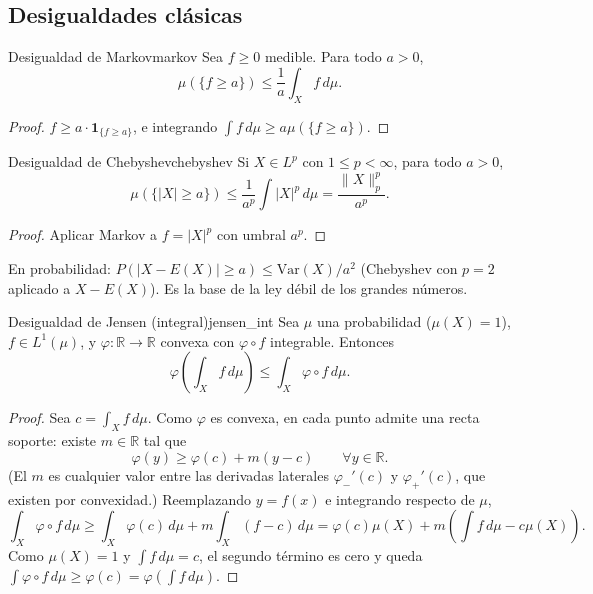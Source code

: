 \documentclass[11pt, a4paper]{article}
\begin{document}
\subsection{Desigualdades clásicas}

\begin{teorema}{Desigualdad de Markov}{markov}
Sea $f \ge 0$ medible. Para todo $a > 0$,
$$ \mu(\{f \ge a\}) \le \frac{1}{a} \int_X f \, d\mu. $$
\end{teorema}

\begin{proof}
$f \ge a \cdot \mathbf{1}_{\{f \ge a\}}$, e integrando $\int f \, d\mu \ge a \mu(\{f \ge a\})$.
\end{proof}

\begin{corolario}{Desigualdad de Chebyshev}{chebyshev}
Si $X \in L^p$ con $1 \le p < \infty$, para todo $a > 0$,
$$ \mu(\{|X| \ge a\}) \le \frac{1}{a^p} \int |X|^p \, d\mu = \frac{\|X\|_p^p}{a^p}. $$
\end{corolario}

\begin{proof}
Aplicar Markov a $f = |X|^p$ con umbral $a^p$.
\end{proof}

\obs En probabilidad: $P(|X - E(X)| \ge a) \le \mathrm{Var}(X) / a^2$ (Chebyshev con $p = 2$
aplicado a $X - E(X)$). Es la base de la ley débil de los grandes números.

\begin{teorema}{Desigualdad de Jensen (integral)}{jensen_int}
Sea $\mu$ una probabilidad ($\mu(X) = 1$), $f \in L^1(\mu)$, y $\varphi: \mathbb{R} \to \mathbb{R}$
convexa con $\varphi \circ f$ integrable. Entonces
$$ \varphi\!\left(\int_X f \, d\mu\right) \le \int_X \varphi \circ f \, d\mu. $$
\end{teorema}

\begin{proof}
Sea $c = \int_X f \, d\mu$. Como $\varphi$ es convexa, en cada punto admite una recta soporte:
existe $m \in \mathbb{R}$ tal que
$$ \varphi(y) \ge \varphi(c) + m (y - c) \qquad \forall y \in \mathbb{R}. $$
(El $m$ es cualquier valor entre las derivadas laterales $\varphi_-'(c)$ y $\varphi_+'(c)$, que
existen por convexidad.) Reemplazando $y = f(x)$ e integrando respecto de $\mu$,
$$ \int_X \varphi \circ f \, d\mu \ge \int_X \varphi(c) \, d\mu + m \int_X (f - c) \, d\mu
= \varphi(c) \mu(X) + m \left(\int f \, d\mu - c \mu(X)\right). $$
Como $\mu(X) = 1$ y $\int f \, d\mu = c$, el segundo término es cero y queda
$\int \varphi \circ f \, d\mu \ge \varphi(c) = \varphi(\int f \, d\mu)$.
\end{proof}
\end{document}
